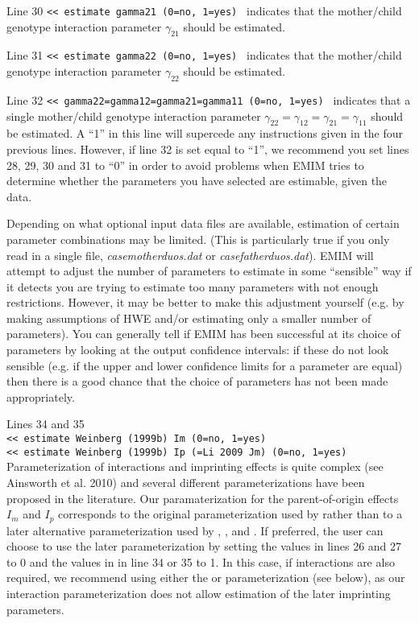 \documentclass[a4paper,11pt]{report}
\begin{document}
Line 30
{\tt	<< estimate gamma21 (0=no, 1=yes)
}
indicates that the mother/child genotype interaction parameter $\gamma_{21}$ should be estimated.

Line 31
{\tt	<< estimate gamma22 (0=no, 1=yes)
}
indicates that the mother/child genotype interaction parameter $\gamma_{22}$ should be estimated.

Line 32
{\tt	<< gamma22=gamma12=gamma21=gamma11 (0=no, 1=yes)
}
indicates that a single mother/child genotype interaction parameter 
$\gamma_{22}=\gamma_{12}=\gamma_{21}=\gamma_{11}$ should be estimated.
A ``1'' in this line will supercede any instructions given 
in the four previous lines.
However, if line 32 is set equal to ``1'', we recommend you set lines 28, 29, 30 and 31 to ``0'' in order to avoid problems when EMIM tries to determine whether
the parameters you have selected are estimable, given the data.

\bigskip

Depending on  what optional input data files are available, estimation of certain parameter combinations may be limited. (This is particularly true if you only read in a single file, {\it casemotherduos.dat} or 
{\it casefatherduos.dat}). EMIM will attempt to adjust the number of
 parameters to estimate in some ``sensible'' way if it detects you are 
trying to estimate too many parameters with not enough restrictions. 
However, it may be better
 to make this adjustment yourself (e.g.
by making assumptions of HWE and/or estimating only a smaller number of parameters). You can generally tell if EMIM has been successful at 
its choice of parameters by looking at the output confidence intervals:  if these do not look sensible (e.g. if the upper and lower confidence limits for a parameter are equal)
then there is a good chance that the  choice of parameters has not been made appropriately.

\bigskip

Lines 34 and 35 \\
{\tt	<< estimate Weinberg (1999b) Im (0=no, 1=yes)
} \\
{\tt    << estimate Weinberg (1999b) Ip (=Li 2009 Jm) (0=no, 1=yes)
}
\\
Parameterization of interactions and imprinting effects is quite complex 
(see Ainsworth et al. 2010) and 
several different parameterizations have been proposed in the literature.
Our paramaterization for the parent-of-origin effects $I_m$ and $I_p$ corresponds to the original 
parameterization used by  \citet{weinberg:etal:98} rather than to a later alternative parameterization used by  \citet{weinberg:99b}, \citet{parimi:etal:08}, and \citet{li:etal:09}.
If preferred, the user can choose to use the later parameterization 
by setting the values in lines 26 and 27 to 0 and the values in
in line 34 or 35 to 1. In this case, if interactions are also required, we recommend using
either the \citet{sinsheimer:etal:03} or \citet{palmer:etal:06} parameterization (see below), as
our interaction parameterization does not allow estimation of the later \citet{weinberg:99b}
imprinting parameters.
\end{document}
